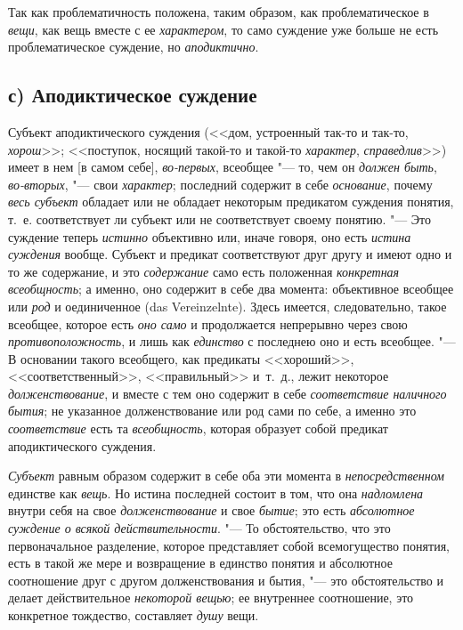 \label{bkm:bm66b}Так как проблематичность положена, таким
образом, как проблематическое в
{\em вещи}, как вещь
вместе с ее {\em характером},
то само суждение уже больше не есть проблематическое
суждение, но {\em аподиктично}.

\subsection[с) Аподиктическое суждение]{с) Аподиктическое суждение}
Субъект аподиктического суждения (<<дом, устроенный так-то и
так-то, {\em хорош}>>;
<<поступок, носящий такой-то и такой-то
{\em характер},
{\em справедлив}>>) имеет в
нем [в самом себе], {\em во-первых},
всеобщее "--- то, чем он
{\em должен быть},
{\em во-вторых}, "--- свои
{\em характер}; последний
содержит в себе {\em основание},
почему {\em весь субъект}
обладает или не обладает некоторым предикатом суждения
понятия, т.~е. соответствует ли субъект или не соответствует своему
понятию. "--- Это суждение теперь
{\em истинно} объективно
или, иначе говоря, оно есть {\em истина
суждения} вообще. Субъект и предикат соответствуют друг
другу и имеют одно и то же содержание, и это
{\em содержание} само
есть положенная {\em конкретная
всеобщность}; а именно, оно содержит в себе два момента:
объективное всеобщее или {\em род}
и оединиченное (das Vereinzelnte). Здесь
имеется, следовательно, такое всеобщее, которое есть
{\em оно само} и
продолжается непрерывно через свою
{\em противоположность},
и лишь как {\em единство}
с последнею оно и есть всеобщее. "--- В основании
такого всеобщего, как предикаты <<хороший>>, <<соответственный>>, <<правильный>>
и~т.~д., лежит некоторое
{\em долженствование}, и
вместе с тем оно содержит в себе
{\em соответствие наличного бытия};
не указанное долженствование или род сами по себе, а именно
это {\em соответствие}
есть та
{\em всеобщность},
которая образует собой предикат аподиктического суждения.

{\em Субъект} равным
образом содержит в себе оба эти момента в
{\em непосредственном}
единстве как {\em вещь}.
Но истина последней состоит в том, что она
{\em надломлена} внутри
себя на свое {\em долженствование}
и свое {\em бытие};
это есть {\em абсолютное
суждение о всякой действительности}. "--- То обстоятельство,
что это первоначальное разделение, которое представляет собой всемогущество
понятия, есть в такой же мере и возвращение в единство понятия и абсолютное
соотношение друг с другом долженствования и бытия, "--- это
обстоятельство и делает действительное
{\em некоторой вещью}; ее
внутреннее соотношение, это конкретное тождество, составляет
{\em душу} вещи.

